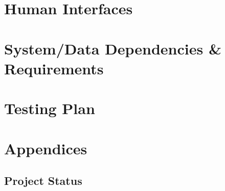 \documentclass[12pt]{article}
\begin{document}
\section{Human Interfaces}
\section{System/Data Dependencies & Requirements}
\section{Testing Plan}
\section{Appendices}
\subsection{Project Status}



\end{document}
